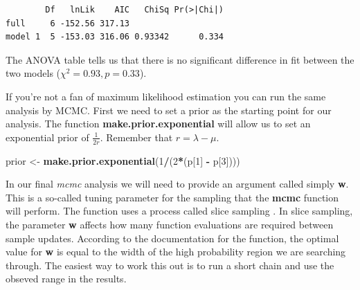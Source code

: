 \documentclass[
]{book}
\newenvironment{Shaded}{\begin{snugshade}}{\end{snugshade}}
\newcommand{\DataTypeTok}[1]{\textcolor[rgb]{0.13,0.29,0.53}{#1}}
\newcommand{\DecValTok}[1]{\textcolor[rgb]{0.00,0.00,0.81}{#1}}
\newcommand{\KeywordTok}[1]{\textcolor[rgb]{0.13,0.29,0.53}{\textbf{#1}}}
\newcommand{\NormalTok}[1]{#1}
\newcommand{\OperatorTok}[1]{\textcolor[rgb]{0.81,0.36,0.00}{\textbf{#1}}}
\newcommand{\StringTok}[1]{\textcolor[rgb]{0.31,0.60,0.02}{#1}}
\begin{document}
\begin{verbatim}
        Df   lnLik    AIC   ChiSq Pr(>|Chi|)
full     6 -152.56 317.13                   
model 1  5 -153.03 316.06 0.93342      0.334
\end{verbatim}

The ANOVA table tells us that there is no significant difference in fit between the two models (\(\chi^{2} = 0.93, p = 0.33\)).

If you're not a fan of maximum likelihood estimation you can run the same analysis by MCMC. First we need to set a prior as the starting point for our analysis. The function \textbf{make.prior.exponential} will allow us to set an exponential prior of \(\frac{1}{2r}\). Remember that \(r = \lambda - \mu\).

\begin{Shaded}
\begin{Highlighting}[]
\NormalTok{prior \textless{}{-}}\StringTok{ }\KeywordTok{make.prior.exponential}\NormalTok{(}\DecValTok{1}\OperatorTok{/}\NormalTok{(}\DecValTok{2}\OperatorTok{*}\NormalTok{(p[}\DecValTok{1}\NormalTok{] }\OperatorTok{{-}}\StringTok{ }\NormalTok{p[}\DecValTok{3}\NormalTok{])))}
\end{Highlighting}
\end{Shaded}

In our final \emph{mcmc} analysis we will need to provide an argument called simply \textbf{w}. This is a so-called tuning parameter for the sampling that the \textbf{mcmc} function will perform. The function uses a process called slice sampling \citep{Neal03}. In slice sampling, the parameter \textbf{w} affects how many function evaluations are required between sample updates. According to the documentation for the function, the optimal value for \textbf{w} is equal to the width of the high probability region we are searching through. The easiest way to work this out is to run a short chain and use the obseved range in the results.

\begin{Shaded}
\end{Shaded}
\end{document}
